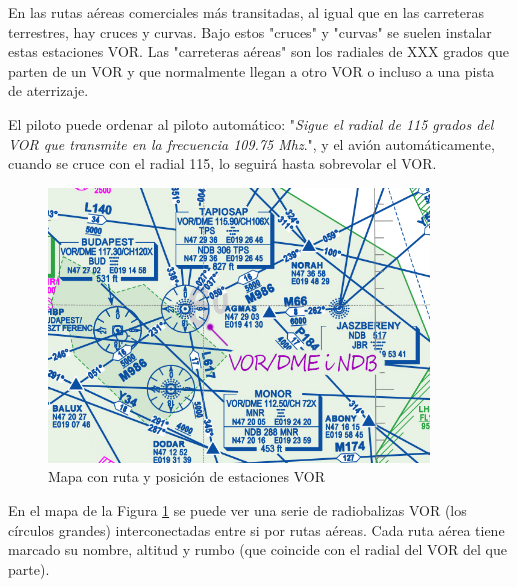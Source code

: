 En las rutas a\'ereas comerciales m\'as transitadas, al igual que en las carreteras terrestres, hay cruces y curvas. Bajo estos "cruces" y "curvas" se suelen instalar estas estaciones VOR. Las "carreteras a\'ereas" son los radiales de XXX grados que parten de un VOR y que normalmente llegan a otro VOR o incluso a una pista de aterrizaje.

El piloto puede ordenar al piloto autom\'atico: "\textit{Sigue el radial de 115 grados del VOR que transmite en la frecuencia 109.75 Mhz}.", y el avi\'on autom\'aticamente, cuando se cruce con el radial 115, lo seguir\'a hasta sobrevolar el VOR.

\begin{figure} [ht]
 \centering
 \includegraphics[width=0.9\textwidth,bb=0 0 500 301]{Imagenes/06.02.vor.imagenes/mapa_vor.jpg}
 \caption{Mapa con ruta y posici\'on de estaciones VOR}
 \label{Mapa_estaciones_VOR}
\end{figure}

En el mapa de la Figura  \ref{Mapa_estaciones_VOR} se puede ver una serie de radiobalizas VOR (los c\'irculos grandes) interconectadas entre si por rutas a\'ereas. Cada ruta a\'erea tiene marcado su nombre, altitud y rumbo (que coincide con el radial del VOR del que parte).


